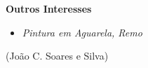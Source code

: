\documentclass[10pt,a4paper,oneside]{article}
\newlength{\datewidth}
\newlength{\textindent}
\begin{document}
\vspace{5mm}
%		
\textbf{\hspace{\textindent}Outros Interesses}
\begin{itemize}
%	
\item[\hspace{\datewidth}\scriptsize  ] \parbox[t]{\dimexpr\linewidth-\datewidth-\textindent}{\textit{Pintura em Aguarela, Remo}}
		
\end{itemize}
	
	\vspace{2cm}
	
	\begin{center}
		(João C. Soares e Silva)
	\end{center}
	
\end{document}
